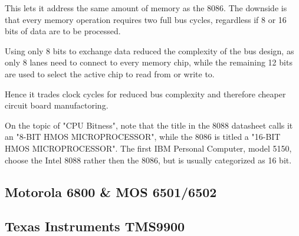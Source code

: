 \documentclass[twoside,twocolumn]{article}
\begin{document}
This lets it address the same amount of memory as the 8086. The downside is that every
memory operation requires two full bus cycles, regardless if 8 or 16 bits of data are
to be processed.

Using only 8 bits to exchange data reduced the complexity of the bus design, as only 8
lanes need to connect to every memory chip, while the remaining 12 bits are used to
select the active chip to read from or write to.

Hence it trades clock cycles for reduced bus complexity and therefore cheaper circuit
board manufactoring.

On the topic of "CPU Bitness", note that the title in the 8088 datasheet calls it an
"8-BIT HMOS MICROPROCESSOR"\cite{intel8088}, while the 8086 is titled a "16-BIT HMOS
MICROPROCESSOR"\cite{intel8086}. The first IBM Personal Computer, model 5150, choose
the Intel 8088 rather then the 8086, but is usually categorized as 16 bit.

\subsection{Motorola 6800 \& MOS 6501/6502}

\subsection{Texas Instruments TMS9900}

\end{document}
